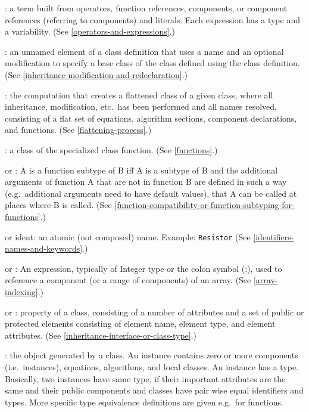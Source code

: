 : a term built from operators, function references,
components, or component references (referring to components) and
literals. Each expression has a type and a variability. (See \cref{operators-and-expressions}.)

: an unnamed element of a class definition that
uses a name and an optional modification to specify a base class of the
class defined using the class definition. (See \cref{inheritance-modification-and-redeclaration}.)

: the computation that creates a flattened class of a
given class, where all inheritance, modification, etc.\ has been
performed and all names resolved, consisting of a flat set of equations,
algorithm sections, component declarations, and functions. (See \cref{flattening-process}.)

: a class of the specialized class function. (See \cref{functions}.)

 or : A
is a function subtype of B iff A is a subtype of B and the additional
arguments of function A that are not in function B are defined in such a
way (e.g.\ additional arguments need to have default values), that A can
be called at places where B is called. (See \cref{function-compatibility-or-function-subtyping-for-functions}.)

 or ident: an atomic (not composed) name. Example:
\lstinline!Resistor! (See \cref{identifiers-names-and-keywords}.)

 or : An expression, typically of
Integer type or the colon symbol (:), used to reference a component (or
a range of components) of an array. (See \cref{array-indexing}.)

 or : property of a
class, consisting of a number of attributes and a set of public or
protected elements consisting of element name, element type, and element
attributes. (See \cref{inheritance-interface-or-class-type}.)

: the object generated by a class. An instance contains
zero or more components (i.e.\ instances), equations, algorithms, and
local classes. An instance has a type. Basically, two instances have
same type, if their important attributes are the same and their public
components and classes have pair wise equal identifiers and types. More
specific type equivalence definitions are given e.g.\ for functions.


